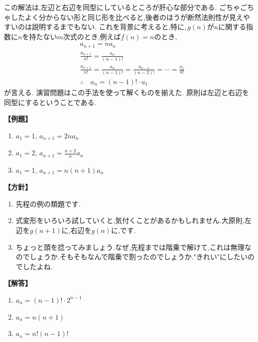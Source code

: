 \documentclass[dvipdfmx,a4paper,11pt,fleqn,openany]{jsbook}
\begin{document}
      この解法は,左辺と右辺を同型にしているところが肝心な部分である.
      ごちゃごちゃしたよく分からない形と同じ形を比べると,後者のほうが断然法則性が見えやすいのは説明するまでもない.
      これを背景に考えると,特に,\,$g(n)$が$n$に関する指数に$n$を持たない$m$次式のとき,例えば$f(n)=n$のとき,
      \begin{align*}
        &a_{n+1}=na_n\\
        &\frac{a_{n+1}}{n!}=\frac{a_n}{(n-1)!}\\
        &\frac{a_{n+1}}{n!}=\frac{a_n}{(n-1)!}=\frac{a_{n-1}}{(n-2)!}=\cdots=\frac{a_1}{0!}\\
        &\therefore \quad a_n=(n-1)!\cdot a_1
      \end{align*}
      が言える.
      演習問題はこの手法を使って解くものを揃えた.
      原則は左辺と右辺を同型にするということである.

      \noindent \textbf{【例題】}
      \begin{enumerate}[label=(\arabic*),parsep=3pt]
        \item $\displaystyle a_1=1,\, a_{n+1}=2na_n$
        \item $\displaystyle a_1=2,\, a_{n+1}=\frac{n+2}{n}a_n$
        \item $\displaystyle a_1=1,\, a_{n+1}=n(n+1)a_n$
      \end{enumerate}

      \noindent\textbf{【方針】}
      \begin{enumerate}[label=(\arabic*),parsep=3pt]
        \item 先程の例の類題です.
        \item 式変形をいろいろ試していくと,気付くことがあるかもしれません.大原則,左辺を$g(n+1)$に,右辺を$g(n)$に,です.
        \item ちょっと頭を捻ってみましょう.なぜ,先程までは階乗で解けて,これは無理なのでしょうか.そもそもなんで階乗で割ったのでしょうか."きれい"にしたいのでしたよね.
      \end{enumerate}

      \noindent\textbf{【解答】}
      \begin{enumerate}[label=(\arabic*),parsep=3pt]
        \item $\displaystyle a_n=(n-1)!\cdot 2^{n-1}$
        \item $\displaystyle a_n=n(n+1)$
        \item $\displaystyle a_n=n!(n-1)!$
      \end{enumerate}
\end{document}
